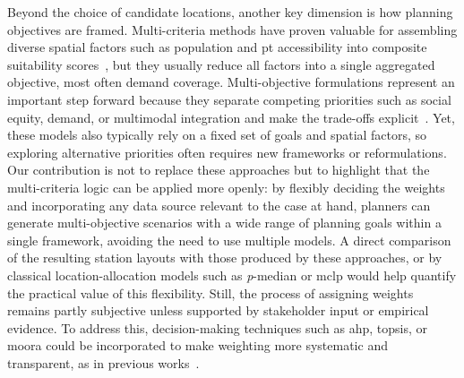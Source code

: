 Beyond the choice of candidate locations, another key dimension is how planning objectives are framed. Multi-criteria methods have proven valuable for assembling diverse spatial factors such as population and \ac{pt} accessibility into composite suitability scores~\cite{Kabak2018, Fazio2021, Veillette2018, Tera2023}, but they usually reduce all factors into a single aggregated objective, most often demand coverage. Multi-objective formulations represent an important step forward because they separate competing priorities such as social equity, demand, or multimodal integration and make the trade-offs explicit~\cite{Conrow2018, Duran-Rodas2021, Caggiani2020, Qian2022, Fan2024, Nikiforiadis2021}. Yet, these models also typically rely on a fixed set of goals and spatial factors, so exploring alternative priorities often requires new frameworks or reformulations. Our contribution is not to replace these approaches but to highlight that the multi-criteria logic can be applied more openly: by flexibly deciding the weights and incorporating any data source relevant to the case at hand, planners can generate multi-objective scenarios with a wide range of planning goals within a single framework, avoiding the need to use multiple models. A direct comparison of the resulting station layouts with those produced by these approaches, or by classical location-allocation models such as \textit{p}-median or \ac{mclp} would help quantify the practical value of this flexibility. Still, the process of assigning weights remains partly subjective unless supported by stakeholder input or empirical evidence. To address this, decision-making techniques such as \ac{ahp}, \ac{topsis}, or \ac{moora} could be incorporated to make weighting more systematic and transparent, as in previous works~\cite{Kabak2018, Guler2021a, Bahadori2022}.


